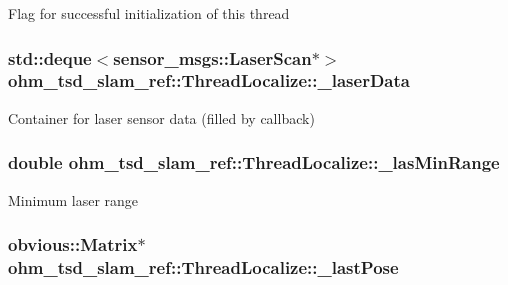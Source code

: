 Flag for successful initialization of this thread \hypertarget{classohm__tsd__slam__ref_1_1ThreadLocalize_ab4560c87e6163708f39d4cdfc2f8a074}{
\subsubsection[{\-\_\-laser\-Data}]{\setlength{\rightskip}{0pt plus 5cm}std\-::deque$<$sensor\-\_\-msgs\-::\-Laser\-Scan$\ast$$>$ ohm\-\_\-tsd\-\_\-slam\-\_\-ref\-::\-Thread\-Localize\-::\-\_\-laser\-Data\hspace{0.3cm}{\ttfamily [private]}}}\label{classohm__tsd__slam__ref_1_1ThreadLocalize_ab4560c87e6163708f39d4cdfc2f8a074}
Container for laser sensor data (filled by callback) \hypertarget{classohm__tsd__slam__ref_1_1ThreadLocalize_a6170ca0dd6108536689c4dab3f7425f6}{
\subsubsection[{\-\_\-las\-Min\-Range}]{\setlength{\rightskip}{0pt plus 5cm}double ohm\-\_\-tsd\-\_\-slam\-\_\-ref\-::\-Thread\-Localize\-::\-\_\-las\-Min\-Range\hspace{0.3cm}{\ttfamily [private]}}}\label{classohm__tsd__slam__ref_1_1ThreadLocalize_a6170ca0dd6108536689c4dab3f7425f6}
Minimum laser range \hypertarget{classohm__tsd__slam__ref_1_1ThreadLocalize_a9b1c9b9fbbf202c5532755553cb42964}{
\subsubsection[{\-\_\-last\-Pose}]{\setlength{\rightskip}{0pt plus 5cm}obvious\-::\-Matrix$\ast$ ohm\-\_\-tsd\-\_\-slam\-\_\-ref\-::\-Thread\-Localize\-::\-\_\-last\-Pose\hspace{0.3cm}{\ttfamily [private]}}}\label{classohm__tsd__slam__ref_1_1ThreadLocalize_a9b1c9b9fbbf202c5532755553cb42964}
